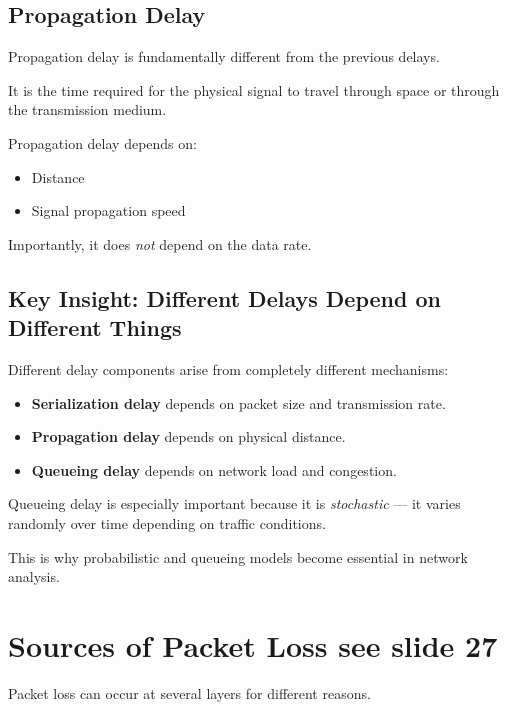 \subsection{Propagation Delay}

Propagation delay is fundamentally different from the previous delays.

It is the time required for the physical signal to travel through space or
through the transmission medium.

Propagation delay depends on:
\begin{itemize}[leftmargin=1.5em]
    \item Distance
    \item Signal propagation speed
\end{itemize}

Importantly, it does \emph{not} depend on the data rate.

\subsection{Key Insight: Different Delays Depend on Different Things}

Different delay components arise from completely different mechanisms:

\begin{itemize}[leftmargin=1.5em]
    \item \textbf{Serialization delay} depends on packet size and transmission rate.

    \item \textbf{Propagation delay} depends on physical distance.

    \item \textbf{Queueing delay} depends on network load and congestion.
\end{itemize}

Queueing delay is especially important because it is \emph{stochastic} --- it
varies randomly over time depending on traffic conditions.

This is why probabilistic and queueing models become essential in network
analysis.

\section{Sources of Packet Loss see slide 27}

Packet loss can occur at several layers for different reasons.

